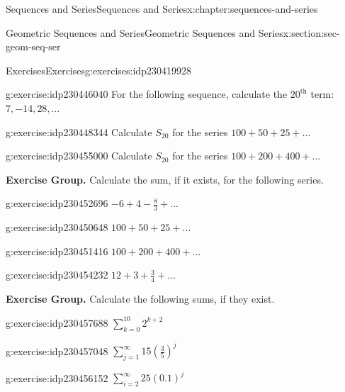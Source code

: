 \documentclass[twoside,10pt,]{book}
\numberwithin{equation}{section}
\newcommand{\upth}[1]{{#1^{\text{th}}}}
\begin{document}
\begin{chapterptx}{Sequences and Series}{}{Sequences and Series}{}{}{x:chapter:sequences-and-series}
\begin{sectionptx}{Geometric Sequences and Series}{}{Geometric Sequences and Series}{}{}{x:section:sec-geom-seq-ser}
\begin{exercises-subsection}{Exercises}{}{Exercises}{}{}{g:exercises:idp230419928}
\begin{divisionexercise}{20}{}{}{g:exercise:idp230446040}
For the following sequence, calculate the \(\upth{20}\) term:  \(7, -14, 28, \ldots\)\end{divisionexercise}%
\begin{divisionexercise}{21}{}{}{g:exercise:idp230448344}%
Calculate \(S_{20}\) for the series \(100 + 50 + 25 + \ldots\)\end{divisionexercise}%
\begin{divisionexercise}{22}{}{}{g:exercise:idp230455000}%
Calculate \(S_{20}\) for the series \(100 + 200 + 400 + \ldots\)\end{divisionexercise}%
\par\medskip\noindent%
\textbf{Exercise Group.}\space\space%
Calculate the sum, if it exists, for the following series.\begin{exercisegroup}
\begin{divisionexerciseeg}{23}{}{}{g:exercise:idp230452696}%
\(- 6 + 4 - \frac{8}{3} + \ldots\)\end{divisionexerciseeg}%
\begin{divisionexerciseeg}{24}{}{}{g:exercise:idp230450648}%
\(100 + 50 + 25 + \ldots\)\end{divisionexerciseeg}%
\begin{divisionexerciseeg}{25}{}{}{g:exercise:idp230451416}%
\(100 + 200 + 400 + \ldots\)\end{divisionexerciseeg}%
\begin{divisionexerciseeg}{26}{}{}{g:exercise:idp230454232}%
\(12 + 3 + \frac{3}{4}+ \ldots\)\end{divisionexerciseeg}%
\end{exercisegroup}
\par\medskip\noindent
\par\medskip\noindent%
\textbf{Exercise Group.}\space\space%
Calculate the following sums, if they exist.\begin{exercisegroup}
\begin{divisionexerciseeg}{27}{}{}{g:exercise:idp230457688}%
\(\sum\limits_{k = 0}^{10} {{2^{k + 2}}}\)\end{divisionexerciseeg}%
\begin{divisionexerciseeg}{28}{}{}{g:exercise:idp230457048}%
\({\sum\limits_{j = 1}^\infty  {15\left( {\frac{3}{5}} \right)} ^j}\)\end{divisionexerciseeg}%
\begin{divisionexerciseeg}{29}{}{}{g:exercise:idp230456152}%
\(\sum\limits_{i = 2}^\infty  {25{{\left( {0.1} \right)}^j}}\)\end{divisionexerciseeg}%

\end{exercisegroup}
\end{exercises-subsection}
\end{sectionptx}
\end{chapterptx}
\end{document}
